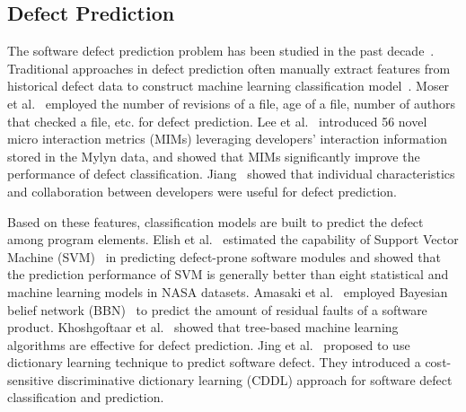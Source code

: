 \subsection{Defect Prediction}
\label{sec:defect}


The software defect prediction problem has been studied in the past decade~\cite{nam2013transfer, menzies2010defect, menzies2007data, zimmermann2007predicting, jiang2013personalized, nagappan2007using, nguyen2011topic, wang2012compressed}. Traditional approaches in defect prediction often manually extract features from historical defect data to construct machine learning classification model~\cite{menzies2010defect}. 
Moser et al.~\cite{moser2008comparative} employed the number of revisions of a file, age of a file, number of authors that checked a file, etc. for defect prediction. 
Lee et al.~\cite{lee2011micro} introduced 56 novel micro interaction metrics (MIMs) leveraging developers' interaction information stored in the Mylyn data, and showed that MIMs significantly improve the performance of defect classification. Jiang~\cite{jiang2013personalized} showed that individual characteristics and collaboration between developers were useful for defect prediction. 

Based on these features, classification models are built to predict the defect among program elements. Elish et al.~\cite{elish2008predicting} estimated the capability of Support Vector Machine (SVM)~\cite{suykens1999least} in predicting defect-prone software modules and showed that the prediction performance of SVM is generally better than eight statistical and machine learning models in NASA datasets. Amasaki et al.~\cite{amasaki2003bayesian} employed Bayesian belief network (BBN)~\cite{mcabeebayesian} to predict the amount of residual faults of a software product. Khoshgoftaar et al.~\cite{khoshgoftaar2002tree}
showed that tree-based machine learning algorithms are effective for defect prediction. 
Jing et al.~\cite{jing2014dictionary} proposed to use dictionary learning technique to predict software defect. They introduced a cost-sensitive discriminative dictionary learning (CDDL) approach for software defect classification and prediction.

